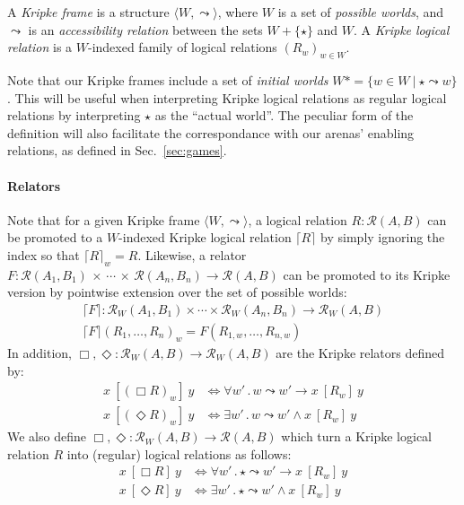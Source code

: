 \documentclass[acmsmall,anonymous]{acmart}
\newcommand{\ifr}[1]{\ [{#1}]\ }
\begin{document}
\begin{definition}
A \emph{Kripke frame} is a structure $\langle W, \leadsto \rangle$, where
$W$ is a set of \emph{possible worlds}, and
$\leadsto$ is an \emph{accessibility relation}
between the sets $W + \{\star\}$ and $W$.
A \emph{Kripke logical relation} is
a $W$-indexed family of logical relations $(R_w)_{w \in W}$.
\end{definition}

Note that our Kripke frames
include a set of \emph{initial worlds}
$W* = \{ w \in W \ |\  \star \leadsto w \}$.
This will be useful when interpreting Kripke logical relations
as regular logical relations
by interpreting $\star$ as the ``actual world''.
The peculiar form of the definition
will also facilitate the correspondance with
our arenas' enabling relations,
as defined in Sec.~\ref{sec:games}.

\paragraph{Relators}

Note that for a given Kripke frame $\langle W, \leadsto \rangle$,
a logical relation $R : \mathcal{R}(A, B)$
can be promoted to a $W$-indexed Kripke logical relation $\lceil R \rceil$
by simply ignoring the index so that $\lceil R \rceil_w = R$.
Likewise,
a relator
  $F : \mathcal{R}(A_1, B_1) \,\times\,\cdots\,\times\,\mathcal{R}(A_n, B_n) \rightarrow \mathcal{R}(A, B)$
can be promoted to its Kripke version
by pointwise extension over the set of possible worlds:
\begin{gather*}
  \lceil F \rceil : \mathcal{R}_W(A_1, B_1) \times \cdots \times \mathcal{R}_W(A_n, B_n) \rightarrow \mathcal{R}_W(A, B) \\
  \lceil F \rceil (R_1, \ldots, R_n)_w = F(R_{1,w}, \ldots, R_{n,w})
\end{gather*}
In addition,
$\Box, \Diamond : \mathcal{R}_W(A,B) \rightarrow \mathcal{R}_W(A,B)$
are the Kripke relators defined by:
\begin{align*}
  x \ifr{(\Box R)_w} y &\Leftrightarrow
    \forall w' \,.\, w \leadsto w' \rightarrow x \ifr{R_w} y \\
  x \ifr{(\Diamond R)_w} y &\Leftrightarrow
    \exists w' \,.\, w \leadsto w' \wedge x \ifr{R_w} y
\end{align*}
We also define
$\Box, \Diamond : \mathcal{R}_W(A,B) \rightarrow \mathcal{R}(A,B)$
which turn a Kripke logical relation $R$
into (regular) logical relations as follows:
\begin{align*}
  x \ifr{\Box R} y &\Leftrightarrow
    \forall w' \,.\, \star \leadsto w' \rightarrow x \ifr{R_w} y \\
  x \ifr{\Diamond R} y &\Leftrightarrow
    \exists w' \,.\, \star \leadsto w' \wedge x \ifr{R_w} y
\end{align*}
\end{document}
